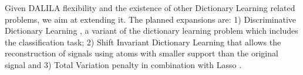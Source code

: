 Given DALILA flexibility and the existence of other Dictionary Learning related problems, we aim at extending it. The planned expansions are: 1) Discriminative Dictionary Learning \cite{mairal2009supervised}, a variant of the dictionary learning problem which includes the classification task; 2) Shift Invariant Dictionary Learning \cite{grosse2012shift} that allows the reconstruction of signals using atoms with smaller support than the original signal and 3) Total Variation penalty in combination with Lasso \cite{salzo2014alternating}.
